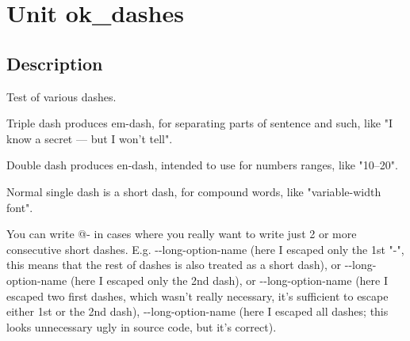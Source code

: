 \documentclass{report}
\begin{document}
\newlength{\tmplength}
\chapter{Unit ok{\_}dashes}
\section{Description}
Test of various dashes.\hfill\vspace*{1ex}



Triple dash produces em{-}dash, for separating parts of sentence and such, like "I know a secret --- but I won't tell".

Double dash produces en{-}dash, intended to use for numbers ranges, like "10--20".

Normal single dash is a short dash, for compound words, like "variable{-}width font".

You can write @{-} in cases where you really want to write just 2 or more consecutive short dashes. E.g. {-}{-}long{-}option{-}name (here I escaped only the 1st "{-}", this means that the rest of dashes is also treated as a short dash), or {-}{-}long{-}option{-}name (here I escaped only the 2nd dash), or {-}{-}long{-}option{-}name (here I escaped two first dashes, which wasn't really necessary, it's sufficient to escape either 1st or the 2nd dash), {-}{-}long{-}option{-}name (here I escaped all dashes; this looks unnecessary ugly in source code, but it's correct).
\end{document}
